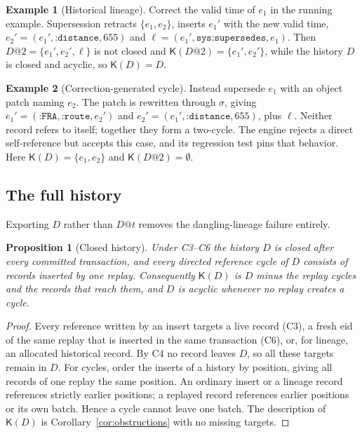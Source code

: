 \documentclass[11pt]{article}
\theoremstyle{plain}
\newtheorem{proposition}[theorem]{Proposition}
\theoremstyle{definition}
\newtheorem{example}{Example}
\theoremstyle{remark}
\newcommand{\sys}[1]{\texttt{sys:#1}}
\newcommand{\iri}[1]{\texttt{#1}}
\newcommand{\Kernel}{\mathsf{K}}
\begin{document}
\begin{example}[Historical lineage]\label{ex:lineage}
Correct the valid time of $e_1$ in the running example. Supersession retracts
$\{e_1,e_2\}$, inserts $e_1'$ with the new valid time, $e_2'=(e_1',\iri{:distance},655)$
and $\ell=(e_1',\sys{supersedes},e_1)$. Then $D@2=\{e_1',e_2',\ell\}$ is not closed
and $\Kernel(D@2)=\{e_1',e_2'\}$, while the history $D$ is closed and acyclic, so
$\Kernel(D)=D$.
\end{example}

\begin{example}[Correction-generated cycle]\label{ex:cycle}
Instead supersede $e_1$ with an object patch naming $e_2$. The patch is rewritten
through $\sigma$, giving $e_1'=(\iri{:FRA},\iri{:route},e_2')$ and
$e_2'=(e_1',\iri{:distance},655)$, plus $\ell$. Neither record refers to itself;
together they form a two-cycle. The engine rejects a direct self-reference but
accepts this case, and its regression test pins that behavior. Here
$\Kernel(D)=\{e_1,e_2\}$ and $\Kernel(D@2)=\emptyset$.
\end{example}

\subsection{The full history}
Exporting $D$ rather than $D@t$ removes the dangling-lineage failure entirely.

\begin{proposition}[Closed history]\label{prop:history}
Under C3--C6 the history $D$ is closed after every committed transaction, and every
directed reference cycle of $D$ consists of records inserted by one replay.
Consequently $\Kernel(D)$ is $D$ minus the replay cycles and the records that reach
them, and $D$ is acyclic whenever no replay creates a cycle.
\end{proposition}
\begin{proof}
Every reference written by an insert targets a live record (C3), a fresh eid of the
same replay that is inserted in the same transaction (C6), or, for lineage, an
allocated historical record. By C4 no record leaves $D$, so all these targets remain
in $D$. For cycles, order the inserts of a history by position, giving all records
of one replay the same position. An ordinary insert or a lineage record references
strictly earlier positions; a replayed record references earlier positions or its
own batch. Hence a cycle cannot leave one batch. The description of $\Kernel(D)$ is
Corollary~\ref{cor:obstructions} with no missing targets.
\end{proof}
\end{document}
